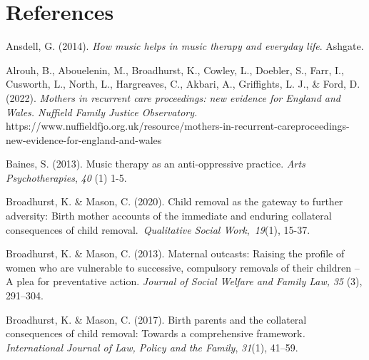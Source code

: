 \documentclass[authordate, empirical]{jote-new-article}
\begin{document}
\section{References}







Ansdell, G. (2014). \emph{How music helps in music therapy and everyday life}. Ashgate.







Alrouh, B., Abouelenin, M., Broadhurst, K., Cowley, L., Doebler, S., Farr, I., Cusworth, L., North, L., Hargreaves, C., Akbari, A., Griffights, L. J., \& Ford, D. (2022). \emph{Mothers in recurrent care proceedings: new evidence for England and Wales. Nuffield Family Justice Observatory.} https://www.nuffieldfjo.org.uk/resource/mothers-in-recurrent-careproceedings-new-evidence-for-england-and-wales







Baines, S. (2013). Music therapy as an anti-oppressive practice. \emph{Arts Psychotherapies}, \emph{40} (1) 1-5.







Broadhurst, K. \& Mason, C. (2020). Child removal as the gateway to further adversity: Birth mother accounts of the immediate and enduring collateral consequences of child removal. \emph{Qualitative Social Work}, \emph{19}(1), 15-37.







Broadhurst, K. \& Mason, C. (2013). Maternal outcasts: Raising the profile of women who are vulnerable to successive, compulsory removals of their children -- A plea for preventative action. \emph{Journal of Social Welfare and Family Law,} \emph{35 }(3), 291--304.







Broadhurst, K. \& Mason, C. (2017). Birth parents and the collateral consequences of child removal: Towards a comprehensive framework\emph{. International Journal of Law, Policy and the Family},\emph{ 31}(1), 41--59.
\end{document}
